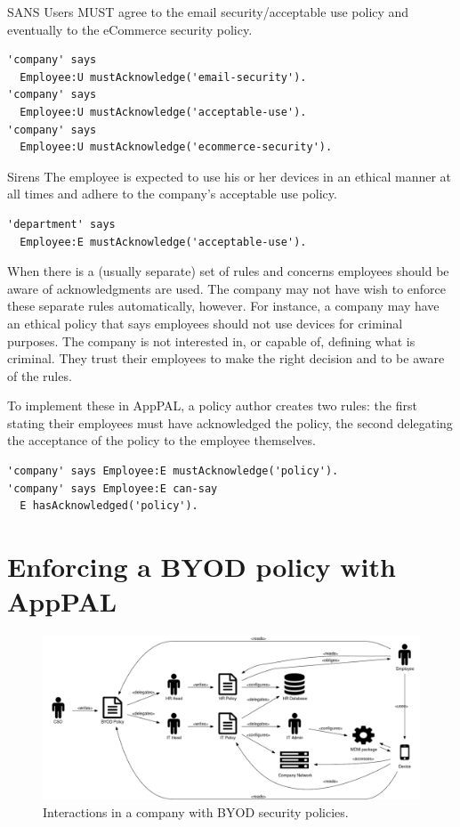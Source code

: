 \documentclass[thesis.tex]{subfiles}
\begin{document}
\begin{policyrule}{SANS}
  Users MUST agree to the email security/acceptable use policy and eventually to the eCommerce security policy.
  \begin{lstlisting}
'company' says
  Employee:U mustAcknowledge('email-security').
'company' says
  Employee:U mustAcknowledge('acceptable-use').
'company' says
  Employee:U mustAcknowledge('ecommerce-security').
  \end{lstlisting}
\end{policyrule}
\begin{policyrule}{Sirens}
  The employee is expected to use his or her devices in an ethical manner at all times and adhere to the company's acceptable use policy.
  \begin{lstlisting}
'department' says
  Employee:E mustAcknowledge('acceptable-use').
  \end{lstlisting}
\end{policyrule}

When there is a (usually separate) set of rules and concerns employees should be aware of acknowledgments are used.
The company may not have wish to enforce these separate rules automatically, however.
For instance, a company may have an ethical policy that says employees should not use devices for criminal purposes.
The company is not interested in, or capable of, defining what is criminal.
They trust their employees to make the right decision and to be aware of the rules.

To implement these in AppPAL, a policy author creates two rules:
  the first stating their employees must have acknowledged the policy,
  the second delegating the acceptance of the policy to the employee themselves.
\begin{lstlisting}
'company' says Employee:E mustAcknowledge('policy').
'company' says Employee:E can-say
  E hasAcknowledged('policy').
\end{lstlisting}


\section{Enforcing a BYOD policy with AppPAL}

\begin{figure}
  \centering
  \includegraphics[width=\textwidth]{figures/mdm-overview.pdf}
  \caption{Interactions in a company with BYOD security policies.}
  \label{fig:mdm-overview}
\end{figure}
\end{document}
